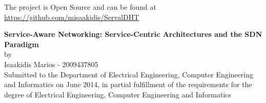 \documentclass[12pt,a4paper,oneside]{article}
\begin{document}
\noindent The project is Open Source and can be found at\\ 
\noindent \href{https://github.com/misaakidis/ServalDHT}{https://github.com/misaakidis/ServalDHT}


\newpage
{}
\tableofcontents


\newpage
{}
{}
\listoffigures


\newpage
{}
{}
\listoftables


\newpage

\renewcommand{\nomname}{Abbreviations}
{}
\printnomenclature


\newpage
{}
\setcounter{page}{1}
\begin{center}
{}
{\large {\bf  Service-Aware Networking: Service-Centric Architectures and the SDN Paradigm}\\[0.5cm] by \\[0.5cm] Isaakidis Marios - 2009437805}
 ~\\[0.5cm]
Submitted to the Department of Electrical Engineering, Computer Engineering and Informatics on June 2014, in partial fulfillment of the requirements for the degree of Electrical Engineering, Computer Engineering and Informatics
\end{center}

\vfill
\end{document}
